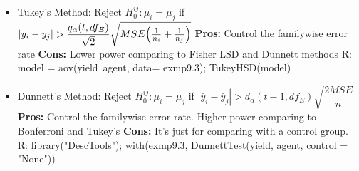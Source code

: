 \documentclass[twoside]{article}
\newcommand{\0}{\mathbf{0}}
\begin{document}
\begin{itemize}
\subsubitem R: \textsf{with(exmp9.3, pairwise.t.test(yield, agent, p.adj = "none"))}
\item Tukey's Method:
\subitem Reject $H_0^{ij}:\mu_i=\mu_j$ if $|\bar{y}_i-\bar{y}_j|>\dfrac{q_\alpha(t,df_E)}{\sqrt{2}}\sqrt{MSE\Bigl(\frac{1}{n_i}+\frac{1}{n_j}\Bigr)}$
\subsubitem \textbf{Pros:} Control the familywise error rate
\subsubitem \textbf{Cons:} Lower power comparing to Fisher LSD and Dunnett methods
\subsubitem R: \textsf{model = aov(yield~agent, data= exmp9.3); TukeyHSD(model)}
\item Dunnett's Method:
\subitem Reject $H_0^{ij}:\mu_i=\mu_j$ if $|\bar{y}_i-\bar{y}_j|>d_\alpha(t-1,df_E)\sqrt{\dfrac{2 MSE}{n}}$
\subsubitem \textbf{Pros:} Control the familywise error rate. Higher power comparing to Bonferroni and Tukey's
\subsubitem \textbf{Cons:} It's just for comparing with a control group.
\subsubitem R: \textsf{library("DescTools"); with(exmp9.3, DunnettTest(yield, agent, control = "None"))}
\end{itemize}
\end{document}
